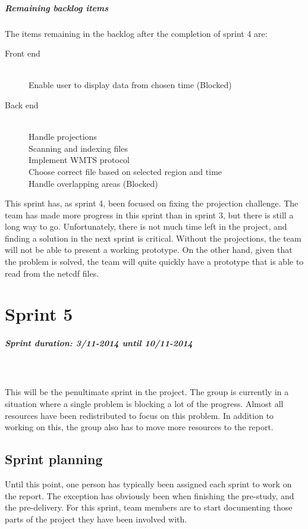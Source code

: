 \documentclass[11pt,a4paper,titlepage,oneside]{report}
\begin{document}
\paragraph{Remaining backlog items}
The items remaining in the backlog after the completion of sprint 4 are:

\begin{description}
	\item[Front end] \hfill \\
	Enable user to display data from chosen time (Blocked)
	\item[Back end] \hfill \\
	Handle projections \hfill \\
	Scanning and indexing files \hfill \\
	Implement \gls{WMTS} \gls{protocol} \hfill \\
	Choose correct file based on selected region and time \hfill \\
	Handle overlapping areas (Blocked)
\end{description}
This sprint has, as sprint 4, been focused on fixing the projection challenge. The team has made more progress in this sprint than in sprint 3, but there is still a long way to go. Unfortunately, there is not much time left in the project, and finding a solution in the next sprint is critical. Without the projections, the team will not be able to present a working \gls{prototype}. On the other hand, given that the problem is solved, the team will quite quickly have a \gls{prototype} that is able to read from the \gls{netcdf} files. 

\chapter{Sprint 5}
\paragraph{Sprint duration: 3/11-2014 until 10/11-2014} \hfill \\
\\
\noindent
This will be the penultimate sprint in the project. The group is currently in a situation where a single problem is blocking a lot of the progress. Almost all resources have been redistributed to focus on this problem. In addition to working on this, the group also has to move more resources to the report. 

\section{Sprint planning}
Until this point, one person has typically been assigned each sprint to work on the report. The exception has obviously been when finishing the \gls{pre-study}, and the \gls{pre-delivery}. For this sprint, team members are to start documenting those parts of the project they have been involved with. 
\end{document}
